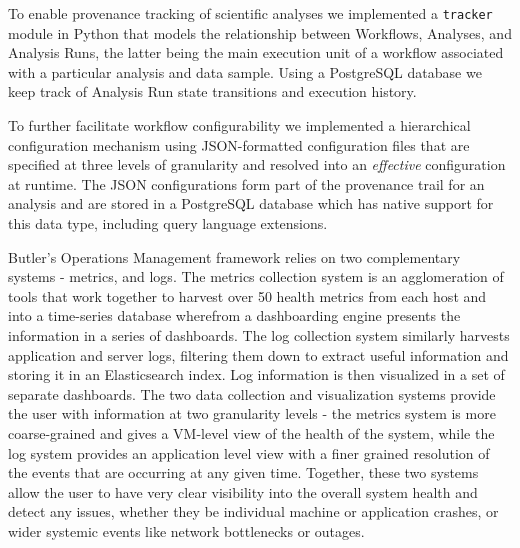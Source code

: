 To enable provenance tracking of scientific analyses we implemented a \texttt{tracker} module in Python that models the relationship between Workflows, Analyses, and Analysis Runs, the latter being the main execution unit of a workflow associated with a particular analysis and data sample. Using a PostgreSQL database we keep track of Analysis Run state transitions and execution history.

To further facilitate workflow configurability we implemented a hierarchical configuration mechanism using JSON-formatted configuration files that are specified at three levels of granularity and resolved into an \emph{effective} configuration at runtime. The JSON configurations form part of the provenance trail for an analysis and are stored in a PostgreSQL database which has native support for this data type, including query language extensions\autocite{lerner2014forge}.

Butler's Operations Management framework relies on two complementary systems - metrics, and logs. The metrics collection system is an agglomeration of tools that work together to harvest over 50 health metrics from each host and into a time-series database wherefrom a dashboarding engine presents the information in a series of dashboards. The log collection system similarly harvests application and server logs, filtering them down to extract useful information and storing it in an Elasticsearch index. Log information is then visualized in a set of separate dashboards. The two data collection and visualization systems provide the user with information at two granularity levels - the metrics system is more coarse-grained and gives a VM-level view of the health of the system, while the log system provides an application level view with a finer grained resolution of the events that are occurring at any given time. Together, these two systems allow the user to have very clear visibility into the overall system health and detect any issues, whether they be individual machine or application crashes, or wider systemic events like network bottlenecks or outages.